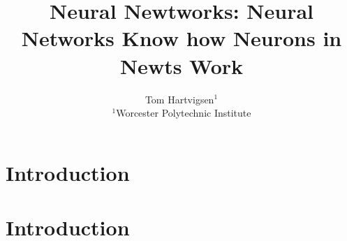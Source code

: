 






\title{Neural Newtworks: Neural Networks Know how Neurons in Newts Work}
\author{
    Tom Hartvigsen$^1$\\
    \affiliations
    $^1$Worcester Polytechnic Institute\\
}



\maketitle

\begin{abstract}
    
\end{abstract}

\section{Introduction}
    
\section{Introduction}




